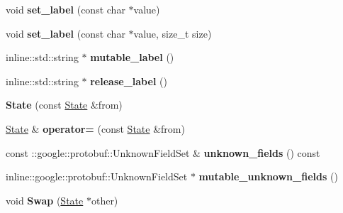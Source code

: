 \begin{DoxyCompactItemize}
\item 
\hypertarget{classgraph_1_1State_a9cd3283f813138b76481ca78732137ce}{
void {\bfseries set\_\-label} (const char $\ast$value)}
\label{classgraph_1_1State_a9cd3283f813138b76481ca78732137ce}

\item 
\hypertarget{classgraph_1_1State_a625e53965b650ff0c0ee33af336a95f7}{
void {\bfseries set\_\-label} (const char $\ast$value, size\_\-t size)}
\label{classgraph_1_1State_a625e53965b650ff0c0ee33af336a95f7}

\item 
\hypertarget{classgraph_1_1State_aebe2f189ede79c89a46de5c86be0daa1}{
inline::std::string $\ast$ {\bfseries mutable\_\-label} ()}
\label{classgraph_1_1State_aebe2f189ede79c89a46de5c86be0daa1}

\item 
\hypertarget{classgraph_1_1State_a8548defb5e484193d98b376d116c3d81}{
inline::std::string $\ast$ {\bfseries release\_\-label} ()}
\label{classgraph_1_1State_a8548defb5e484193d98b376d116c3d81}

\item 
\hypertarget{classgraph_1_1State_adbd7ef24b794167795d267dfbd1d0646}{
{\bfseries State} (const \hyperlink{classgraph_1_1State}{State} \&from)}
\label{classgraph_1_1State_adbd7ef24b794167795d267dfbd1d0646}

\item 
\hypertarget{classgraph_1_1State_ae565f2fef5dc685a53d67b1449672d53}{
\hyperlink{classgraph_1_1State}{State} \& {\bfseries operator=} (const \hyperlink{classgraph_1_1State}{State} \&from)}
\label{classgraph_1_1State_ae565f2fef5dc685a53d67b1449672d53}

\item 
\hypertarget{classgraph_1_1State_a6949f7b56f23e1f22f6ffd92cb22a339}{
const ::google::protobuf::UnknownFieldSet \& {\bfseries unknown\_\-fields} () const }
\label{classgraph_1_1State_a6949f7b56f23e1f22f6ffd92cb22a339}

\item 
\hypertarget{classgraph_1_1State_a7449bfa3aeb18cae2903328f38734898}{
inline::google::protobuf::UnknownFieldSet $\ast$ {\bfseries mutable\_\-unknown\_\-fields} ()}
\label{classgraph_1_1State_a7449bfa3aeb18cae2903328f38734898}

\item 
\hypertarget{classgraph_1_1State_affd9e019264a3a2416563d91dbed1f27}{
void {\bfseries Swap} (\hyperlink{classgraph_1_1State}{State} $\ast$other)}
\label{classgraph_1_1State_affd9e019264a3a2416563d91dbed1f27}


\end{DoxyCompactItemize}
